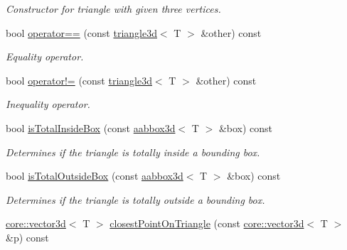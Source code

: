 \begin{DoxyCompactItemize}
\begin{DoxyCompactList}\small\item\em Constructor for triangle with given three vertices. \end{DoxyCompactList}\item 
\mbox{\label{classirr_1_1core_1_1triangle3d_abb94d1199eedc6ab2d2306ca4f5ea86e}} 
bool \hyperlink{classirr_1_1core_1_1triangle3d_abb94d1199eedc6ab2d2306ca4f5ea86e}{operator==} (const \hyperlink{classirr_1_1core_1_1triangle3d}{triangle3d}$<$ T $>$ \&other) const
\begin{DoxyCompactList}\small\item\em Equality operator. \end{DoxyCompactList}\item 
\mbox{\label{classirr_1_1core_1_1triangle3d_a914fd8e860dcb44d9a5d264d0a8b25ec}} 
bool \hyperlink{classirr_1_1core_1_1triangle3d_a914fd8e860dcb44d9a5d264d0a8b25ec}{operator!=} (const \hyperlink{classirr_1_1core_1_1triangle3d}{triangle3d}$<$ T $>$ \&other) const
\begin{DoxyCompactList}\small\item\em Inequality operator. \end{DoxyCompactList}\item 
bool \hyperlink{classirr_1_1core_1_1triangle3d_a9baf7f6b0d49b8046f434cf0829eb8fd}{is\+Total\+Inside\+Box} (const \hyperlink{classirr_1_1core_1_1aabbox3d}{aabbox3d}$<$ T $>$ \&box) const
\begin{DoxyCompactList}\small\item\em Determines if the triangle is totally inside a bounding box. \end{DoxyCompactList}\item 
bool \hyperlink{classirr_1_1core_1_1triangle3d_ac191abc19290c4a7fcad9af3a5707bc1}{is\+Total\+Outside\+Box} (const \hyperlink{classirr_1_1core_1_1aabbox3d}{aabbox3d}$<$ T $>$ \&box) const
\begin{DoxyCompactList}\small\item\em Determines if the triangle is totally outside a bounding box. \end{DoxyCompactList}\item 
\hyperlink{classirr_1_1core_1_1vector3d}{core\+::vector3d}$<$ T $>$ \hyperlink{classirr_1_1core_1_1triangle3d_a0212c09e6804a7a25c3fef791b6b1336}{closest\+Point\+On\+Triangle} (const \hyperlink{classirr_1_1core_1_1vector3d}{core\+::vector3d}$<$ T $>$ \&p) const

\end{DoxyCompactItemize}
